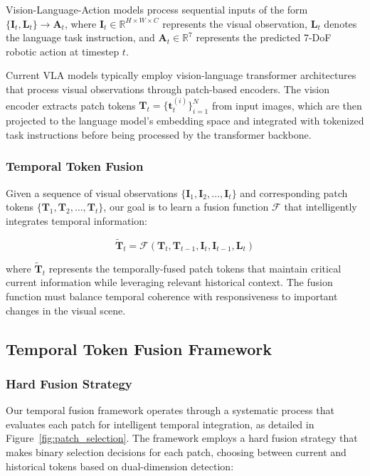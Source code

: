 \documentclass[letterpaper]{article}
\begin{document}
Vision-Language-Action models process sequential inputs of the form $\{\mathbf{I}_t, \mathbf{L}_t\} \rightarrow \mathbf{A}_t$, where $\mathbf{I}_t \in \mathbb{R}^{H \times W \times C}$ represents the visual observation, $\mathbf{L}_t$ denotes the language task instruction, and $\mathbf{A}_t \in \mathbb{R}^7$ represents the predicted 7-DoF robotic action at timestep $t$. 

Current VLA models typically employ vision-language transformer architectures that process visual observations through patch-based encoders. The vision encoder extracts patch tokens $\mathbf{T}_t = \{\mathbf{t}_t^{(i)}\}_{i=1}^{N}$ from input images, which are then projected to the language model's embedding space and integrated with tokenized task instructions before being processed by the transformer backbone.

\subsubsection{Temporal Token Fusion} Given a sequence of visual observations $\{\mathbf{I}_1, \mathbf{I}_2, \ldots, \mathbf{I}_t\}$ and corresponding patch tokens $\{\mathbf{T}_1, \mathbf{T}_2, \ldots, \mathbf{T}_t\}$, our goal is to learn a fusion function $\mathcal{F}$ that intelligently integrates temporal information:

\begin{equation}
\tilde{\mathbf{T}}_t = \mathcal{F}(\mathbf{T}_t, \mathbf{T}_{t-1}, \mathbf{I}_t, \mathbf{I}_{t-1}, \mathbf{L}_t)
\end{equation}

where $\tilde{\mathbf{T}}_t$ represents the temporally-fused patch tokens that maintain critical current information while leveraging relevant historical context. The fusion function must balance temporal coherence with responsiveness to important changes in the visual scene. 

\subsection{Temporal Token Fusion Framework}

\subsubsection{Hard Fusion Strategy}
Our temporal fusion framework operates through a systematic process that evaluates each patch for intelligent temporal integration, as detailed in Figure~\ref{fig:patch_selection}. The framework employs a hard fusion strategy that makes binary selection decisions for each patch, choosing between current and historical tokens based on dual-dimension detection:
\end{document}
